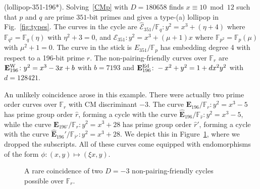 \documentclass[version=preprint]{iacrcc}
\newcommand{\F}{\mathbb{F}}
\newcommand{\EC}{\mathcal{E}}
\begin{document}
\begin{example}(\textsf{lollipop-351-196}*).\label{example:351-196} 
Solving~\eqref{CMp} with $D=180658$ finds $x \equiv 10 \bmod{12}$ such that $p$ and $q$ are prime $351$-bit primes and gives a type-(a) lollipop in Fig.~\ref{fig:types}. The curves in the cycle are $\hat{\EC}_{351}/\F_q \colon y^2=x^3+(\eta+4)$ where  $\F_{q^2}=\F_q(\eta)$ with $\eta^2+3=0$, and ${\EC}_{351} \colon y^2=x^3+(\mu+1)x$ where $\F_{p^2}=\F_p(\mu)$ with $\mu^2+1=0$. The curve in the stick is $E_{351}/\F_p$ has embedding degree 4 with respect to a 196-bit prime $r$. The non-pairing-friendly curves over $\F_r$ are $\mathbf{E}_{196}^{\rm W} \colon y^2=x^3-3x+b$ with $b=7193$ and $\mathbf{E}_{196}^{\rm Ed} \colon -x^2+y^2=1+dx^2y^2$ with $d=128421$. 

An unlikely coincidence arose in this example. There were actually two prime order curves over $\F_r$ with CM discriminant $-3$. The curve $\mathbf{E}_{196}/\F_r \colon y^2=x^3-5$ has prime group order $\hat{r}$, forming a cycle with the curve $\hat{\mathbf{E}}_{196}/\F_{\hat{r}} \colon y^2=x^3-5$, while the curve $\mathbf{E}_{{196}'}/\F_r \colon y^2=x^3+28$ has prime group order $\hat{r}'$, forming a cycle with the curve $\hat{\mathbf{E}}_{196}'/\F_{\hat{r}'} \colon y^2=x^3+28$. We depict this in Figure~\ref{fig:double-cycle}, where we dropped the subscripts. All of these curves come equipped with endomorphisms of the form $\phi \colon (x,y) \mapsto (\xi x,y)$. 

\begin{figure}[ht!]
	\centering
	\caption{A rare coincidence of two $D=-3$ non-pairing-friendly cycles possible over $\F_r$. }
	\label{fig:double-cycle}
\end{figure}


\end{example}
\end{document}
